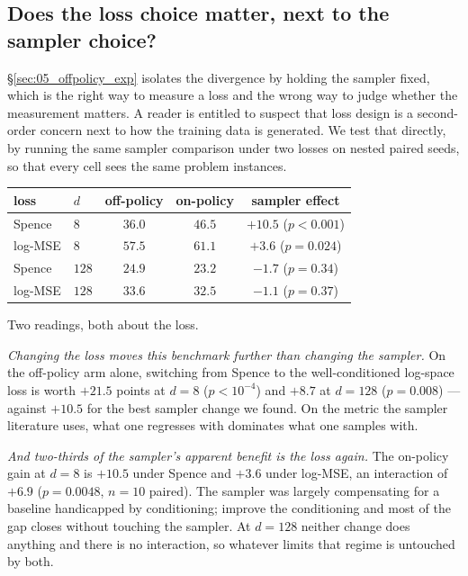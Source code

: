 \subsection{Does the loss choice matter, next to the sampler choice?}
\label{subsec:interaction}

\S\ref{sec:05_offpolicy_exp} isolates the divergence by holding the sampler
fixed, which is the right way to measure a loss and the wrong way to judge
whether the measurement matters. A reader is entitled to suspect that loss
design is a second-order concern next to how the training data is generated.
We test that directly, by running the same sampler comparison under two losses
on nested paired seeds, so that every cell sees the same problem instances.

\begin{center}\small
\begin{tabular}{llccc}
\toprule
loss & $d$ & off-policy & on-policy & sampler effect\\
\midrule
Spence  & $8$   & $36.0$ & $46.5$ & $\mathbf{+10.5}$ ($p<0.001$)\\
log-MSE & $8$   & $57.5$ & $61.1$ & $\mathbf{+3.6}$ ($p=0.024$)\\
Spence  & $128$ & $24.9$ & $23.2$ & $-1.7$ ($p=0.34$)\\
log-MSE & $128$ & $33.6$ & $32.5$ & $-1.1$ ($p=0.37$)\\
\bottomrule
\end{tabular}
\end{center}

Two readings, both about the loss.

\emph{Changing the loss moves this benchmark further than changing the
sampler.} On the off-policy arm alone, switching from Spence to the
well-conditioned log-space loss is worth $+21.5$ points at $d=8$ ($p<10^{-4}$)
and $+8.7$ at $d=128$ ($p=0.008$) --- against $+10.5$ for the best sampler
change we found. On the metric the sampler literature uses, what one regresses
with dominates what one samples with.

\emph{And two-thirds of the sampler's apparent benefit is the loss again.} The
on-policy gain at $d=8$ is $+10.5$ under Spence and $+3.6$ under log-MSE, an
interaction of $+6.9$ ($p=0.0048$, $n=10$ paired). The sampler was largely
compensating for a baseline handicapped by conditioning; improve the
conditioning and most of the gap closes without touching the sampler. At
$d=128$ neither change does anything and there is no interaction, so whatever
limits that regime is untouched by both.

